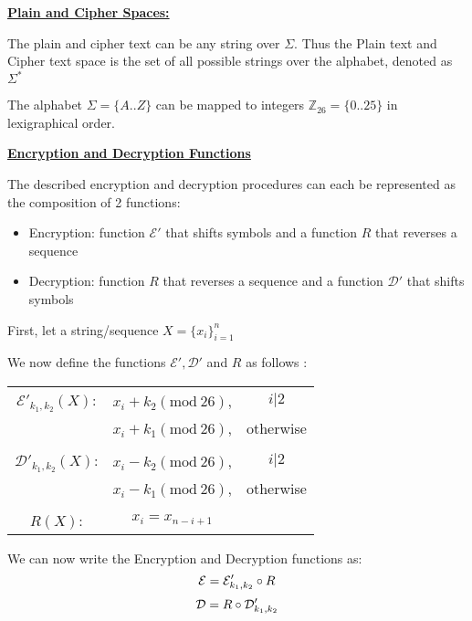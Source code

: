 \documentclass{article}
\numberwithin{equation}{subsection}
\begin{document}
	\underline{\textbf{Plain and Cipher Spaces:}}

	The plain and cipher text can be any string over $\Sigma$. Thus the Plain text and Cipher text space
	is the set of all possible strings over the alphabet, denoted as $\Sigma ^*$

	\underline{}
	\begin{adjustwidth}{1em}{1em}
	The alphabet $\Sigma = \{A..Z\}$ can be mapped to integers $\mathbb{Z}_{26} = \{0..25\}$ in lexigraphical
	order.	
	\end{adjustwidth}
	

	\vspace{20pt}
	\underline{\textbf{Encryption and Decryption Functions}}
	
	The described encryption and decryption procedures can each be represented as the composition of 
	2 functions: 
	\begin{itemize}
		\item Encryption: function $\mathcal{E}'$ that shifts symbols and a function $R$ that reverses a sequence
		\item Decryption: function $R$ that reverses a sequence and a function $\mathcal{D}'$ that shifts symbols 
	\end{itemize}

	\vspace{5pt}
	First, let a string/sequence $X=\{x_i\}^n_{i=1}$ 

	We now define the functions $\mathcal{E}', \mathcal{D}'$ and $R$ as follows :

	\begin{center}
	\begin{tabular}{c c c}	
	$\mathcal{E}'_{k_1, k_2}(X)$: & $x_i+k_2(\textrm{mod}\ 26)$, & $i|2$ \\
																 & $x_i+k_1(\textrm{mod}\ 26)$, & otherwise\\
																 & 														 & \\
		$\mathcal{D}'_{k_1, k_2}(X)$: & $x_i-k_2(\textrm{mod}\ 26)$, & $i|2$ \\
																 & $x_i-k_1(\textrm{mod}\ 26)$, & otherwise\\
																 &&\\
		$R(X)$: 						&			$x_i = x_{n-i+1}$	

	\end{tabular}
	\end{center}

	\vspace{10pt}
	We can now write the Encryption and Decryption functions as:
		\begin{equation}\notag
			\mathcal{E} = \mathcal{E}_{k_1,k_2}' \circ R				
		\end{equation}
		\begin{equation}\notag
			\mathcal{D} = R \circ \mathcal{D}_{k_1, k_2}'				
		\end{equation}
	
\end{document}
